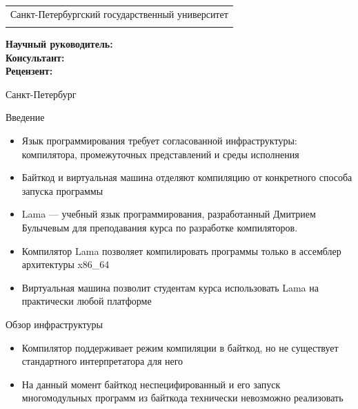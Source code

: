 \documentclass
  [ russian
  , aspectratio=1610
  ] {beamer}
\title[Разработка виртуальной машины]{\my@title@title@ru}
\author[\my@title@author@ru]{\my@title@author@ru, группа \academicGroup}
\institute[СПбГУ]{}
\date[]{}
\makeatletter
\newcommand{\advisorChair}{\my@title@chair@ru}
\newcommand{\supervisor}{\my@title@supervisor@ru}
\newcommand{\supervisorPosition}{\my@title@supervisorPosition@ru}
\newcommand{\consultant}{\my@title@consultant@ru}
\newcommand{\consultantPosition}{\my@title@consultantPosition@ru}
\newcommand{\reviewer}{\my@title@reviewer@ru}
\newcommand{\reviewerPosition}{\my@title@reviewerPosition@ru}
\newcommand{\defenseYear}{\my@title@year@ru}
\makeatother
\begin{document}
{

\begin{frame}
    \vspace{15pt}
    \begin{center}
        \begin{tabular}{c}
            \scriptsize{Санкт-Петербургский государственный университет} \\
            \scriptsize{\advisorChair}
        \end{tabular}
        \titlepage
    \end{center}

    \btVFill

    {\scriptsize
        \textbf{Научный руководитель:}  \supervisorPosition~\supervisor \\
        \textbf{Консультант:}  \consultantPosition~\consultant \\
        \textbf{Рецензент:} \reviewerPosition~\reviewer \\
    }
    \makeatother
    \begin{center}
        \vspace{5pt}
        \scriptsize{Санкт-Петербург\\ \defenseYear}
    \end{center}
\end{frame}
}

\begin{frame}{Введение}
    \begin{itemize}
        \item Язык программирования требует согласованной инфраструктуры: компилятора, промежуточных представлений и среды исполнения
        \item Байткод и виртуальная машина отделяют компиляцию от конкретного
способа запуска программы
      \item  Lama --- учебный язык программирования, разработанный Дмитрием Булычевым для преподавания курса по разработке компиляторов.
      \item Компилятор Lama позволяет компилировать программы только в ассемблер архитектуры
        x86\_64
      \item Виртуальная машина позволит студентам курса использовать Lama на практически любой платформе
      
    \end{itemize}
\end{frame}
\begin{frame}{Обзор инфраструктуры}
    \begin{center}
        \resizebox{0.96\linewidth}{!}{}
    \end{center}
    \begin{itemize}
        \item Компилятор поддерживает режим компиляции в байткод, но не существует стандартного
          интерпретатора для него
        \item На данный момент байткод неспецифированный и его запуск многомодульных программ из байткода технически невозможно реализовать
          
    \end{itemize}
\end{frame}
\end{document}
